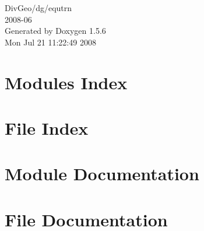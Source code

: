 \documentclass[a4paper]{book}
\begin{document}
\begin{titlepage}
\vspace*{7cm}
\begin{center}
{\Large DivGeo/dg/equtrn \\[1ex]\large 2008-06 }\\
\vspace*{1cm}
{\large Generated by Doxygen 1.5.6}\\
\vspace*{0.5cm}
{\small Mon Jul 21 11:22:49 2008}\\
\end{center}
\end{titlepage}
\clearemptydoublepage
{}
\tableofcontents
\clearemptydoublepage
{}
\chapter{Modules Index}

\chapter{File Index}

\chapter{Module Documentation}





















\chapter{File Documentation}



































\printindex
\end{document}
